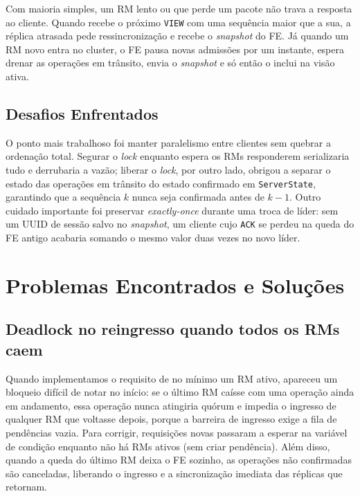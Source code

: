 \documentclass[12pt]{article}
\begin{document}
Com maioria simples, um RM lento ou que perde um pacote não trava a resposta ao cliente. Quando recebe o próximo \texttt{VIEW} com uma sequência maior que a sua, a réplica atrasada pede ressincronização e recebe o \textit{snapshot} do FE. Já quando um RM novo entra no cluster, o FE pausa novas admissões por um instante, espera drenar as operações em trânsito, envia o \textit{snapshot} e só então o inclui na visão ativa.

\subsection{Desafios Enfrentados}

O ponto mais trabalhoso foi manter paralelismo entre clientes sem quebrar a ordenação total. Segurar o \textit{lock} enquanto espera os RMs responderem serializaria tudo e derrubaria a vazão; liberar o \textit{lock}, por outro lado, obrigou a separar o estado das operações em trânsito do estado confirmado em \texttt{ServerState}, garantindo que a sequência $k$ nunca seja confirmada antes de $k - 1$. Outro cuidado importante foi preservar \textit{exactly-once} durante uma troca de líder: sem um UUID de sessão salvo no \textit{snapshot}, um cliente cujo \texttt{ACK} se perdeu na queda do FE antigo acabaria somando o mesmo valor duas vezes no novo líder.

\section{Problemas Encontrados e Soluções}

\subsection{Deadlock no reingresso quando todos os RMs caem}

Quando implementamos o requisito de no mínimo um RM ativo, apareceu um bloqueio difícil de notar no início: se o último RM caísse com uma operação ainda em andamento, essa operação nunca atingiria quórum e impedia o ingresso de qualquer RM que voltasse depois, porque a barreira de ingresso exige a fila de pendências vazia. Para corrigir, requisições novas passaram a esperar na variável de condição enquanto não há RMs ativos (sem criar pendência). Além disso, quando a queda do último RM deixa o FE sozinho, as operações não confirmadas são canceladas, liberando o ingresso e a sincronização imediata das réplicas que retornam.
\end{document}
